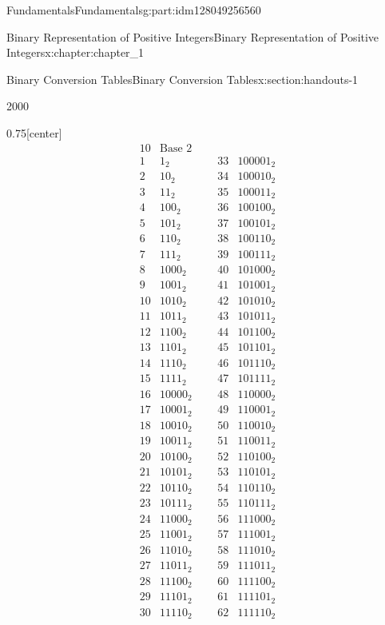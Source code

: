 \documentclass[oneside,10pt,]{book}
\numberwithin{equation}{section}
\begin{document}
\begin{partptx}{Fundamentals}{}{Fundamentals}{}{}{g:part:idm128049256560}
\begin{chapterptx}{Binary Representation of Positive Integers}{}{Binary Representation of Positive Integers}{}{}{x:chapter:chapter_1}
\begin{sectionptx}{Binary Conversion Tables}{}{Binary Conversion Tables}{}{}{x:section:handouts-1}
\begin{sidebyside}{2}{0}{0}{0}
\begin{sbspanel}{0.75}[center]
\begin{equation*}
\begin{array}{ccccc}
{10} & \text{Base 2} \\
1 & 1_2 & \text{     } & 33 &
100001_2 \\
2 & 10_2 & \text{     } & 34
& 100010_2 \\
3 & 11_2 & \text{     } & 35
& 100011_2 \\
4 & 100_2 & \text{     } & 36
& 100100_2 \\
5 & 101_2 & \text{     } & 37
& 100101_2 \\
6 & 110_2 & \text{     } & 38
& 100110_2 \\
7 & 111_2 & \text{     } & 39
& 100111_2 \\
8 & 1000_2 & \text{     } &
40 & 101000_2 \\
9 & 1001_2 & \text{     } &
41 & 101001_2 \\
10 & 1010_2 & \text{     } &
42 & 101010_2 \\
11 & 1011_2 & \text{     } &
43 & 101011_2 \\
12 & 1100_2 & \text{     } &
44 & 101100_2 \\
13 & 1101_2 & \text{     } &
45 & 101101_2 \\
14 & 1110_2 & \text{     } &
46 & 101110_2 \\
15 & 1111_2 & \text{     } &
47 & 101111_2 \\
16 & 10000_2 & \text{     } &
48 & 110000_2 \\
17 & 10001_2 & \text{     } &
49 & 110001_2 \\
18 & 10010_2 & \text{     } &
50 & 110010_2 \\
19 & 10011_2 & \text{     } &
51 & 110011_2 \\
20 & 10100_2 & \text{     } &
52 & 110100_2 \\
21 & 10101_2 & \text{     } &
53 & 110101_2 \\
22 & 10110_2 & \text{     } &
54 & 110110_2 \\
23 & 10111_2 & \text{     } &
55 & 110111_2 \\
24 & 11000_2 & \text{     } &
56 & 111000_2 \\
25 & 11001_2 & \text{     } &
57 & 111001_2 \\
26 & 11010_2 & \text{     } &
58 & 111010_2 \\
27 & 11011_2 & \text{     } &
59 & 111011_2 \\
28 & 11100_2 & \text{     } &
60 & 111100_2 \\
29 & 11101_2 & \text{     } &
61 & 111101_2 \\
30 & 11110_2 & \text{     } &
62 & 111110_2 \\

\end{array}
\end{equation*}
\end{sbspanel}
\end{sidebyside}
\end{sectionptx}
\end{chapterptx}
\end{partptx}
\end{document}
